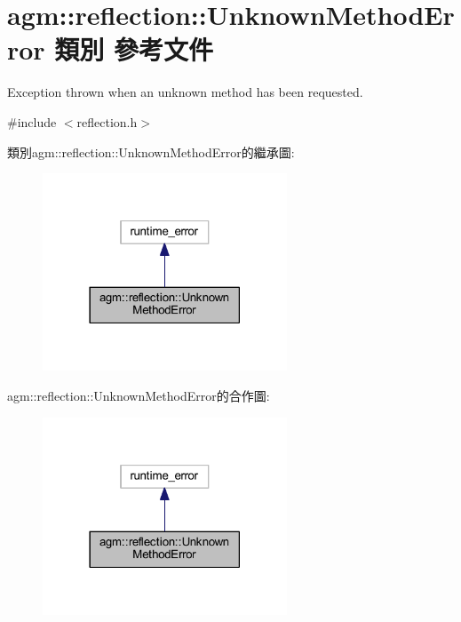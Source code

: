 \hypertarget{classagm_1_1reflection_1_1_unknown_method_error}{}\section{agm\+:\+:reflection\+:\+:Unknown\+Method\+Error 類別 參考文件}
\label{classagm_1_1reflection_1_1_unknown_method_error}


Exception thrown when an unknown method has been requested.  




{\ttfamily \#include $<$reflection.\+h$>$}



類別agm\+:\+:reflection\+:\+:Unknown\+Method\+Error的繼承圖\+:\nopagebreak
\begin{figure}[H]
\begin{center}
\leavevmode
\includegraphics[width=206pt]{classagm_1_1reflection_1_1_unknown_method_error__inherit__graph}
\end{center}
\end{figure}


agm\+:\+:reflection\+:\+:Unknown\+Method\+Error的合作圖\+:\nopagebreak
\begin{figure}[H]
\begin{center}
\leavevmode
\includegraphics[width=206pt]{classagm_1_1reflection_1_1_unknown_method_error__coll__graph}
\end{center}
\end{figure}
